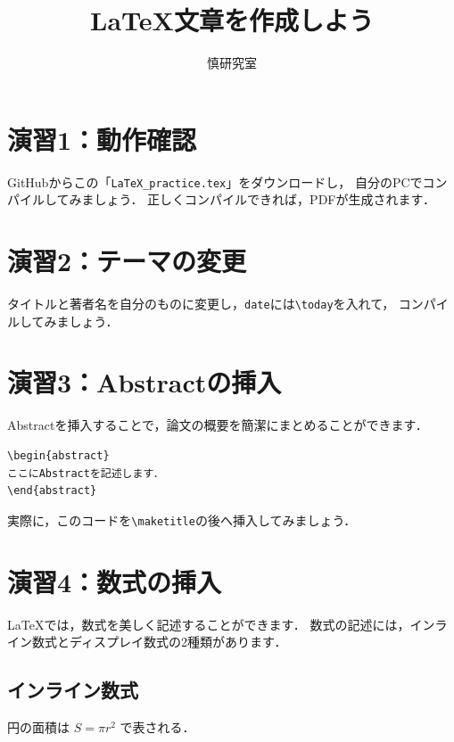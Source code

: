 \documentclass[a4paper,twocolumn]{jsarticle}
\title{%
LaTeX文章を作成しよう
}
\author{慎研究室}
\date{}
\begin{document}
\maketitle


\section*{演習1：動作確認}
GitHubからこの「\texttt{LaTeX\_practice.tex}」をダウンロードし，
自分のPCでコンパイルしてみましょう．
正しくコンパイルできれば，PDFが生成されます．

\section*{演習2：テーマの変更}
タイトルと著者名を自分のものに変更し，\texttt{date}には\verb|\today|を入れて，
コンパイルしてみましょう．

\section*{演習3：Abstractの挿入}
Abstractを挿入することで，論文の概要を簡潔にまとめることができます．

\begin{verbatim}
\begin{abstract}
ここにAbstractを記述します．
\end{abstract}
\end{verbatim}

実際に，このコードを\verb|\maketitle|の後へ挿入してみましょう．

\section*{演習4：数式の挿入}
LaTeXでは，数式を美しく記述することができます．
数式の記述には，インライン数式とディスプレイ数式の2種類があります．

\subsection*{インライン数式}
円の面積は $S=\pi r^2$ で表される．
\end{document}
